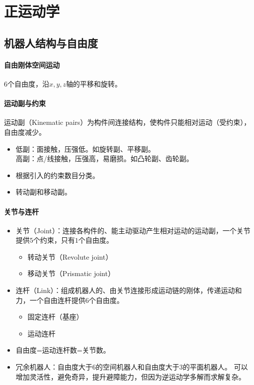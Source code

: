 \documentclass[
12pt, %
a4paper, 
oneside, %
headinclude,footinclude, %
]{scrartcl}
\begin{document}
\section{正运动学}
\subsection{机器人结构与自由度}
\paragraph{自由刚体空间运动}
6个自由度，沿$ x,y,z $轴的平移和旋转。
\paragraph{运动副与约束}
运动副（Kinematic pairs）为构件间连接结构，使构件只能相对运动（受约束），自由度减少。
\begin{itemize}
\item 低副：面接触，压强低。如旋转副、平移副。 \\
高副：点/线接触，压强高，易磨损。如凸轮副、齿轮副。
\item 根据引入的约束数目分类。
\item 转动副和移动副。
\end{itemize}
\paragraph{关节与连杆}
\begin{itemize}
\item 关节（Joint）：连接各构件的、能主动驱动产生相对运动的运动副，一个关节提供$ 5 $个约束，只有$ 1 $个自由度。
\begin{itemize}
\item 转动关节（Revolute joint）
\item 移动关节（Prismatic joint）
\end{itemize}
\item 连杆（Link）：组成机器人的、由关节连接形成运动链的刚体，传递运动和力，一个自由连杆提供$ 6 $个自由度。
\begin{itemize}
\item 固定连杆（基座）
\item 运动连杆
\end{itemize}
\item 自由度=运动连杆数=关节数。
\item 冗余机器人：自由度大于$ 6 $的空间机器人和自由度大于$ 3 $的平面机器人。
可以增加灵活性，避免奇异，提升避障能力，但因为逆运动学多解而求解复杂。
\end{itemize}
\end{document}
